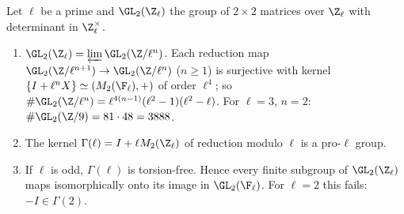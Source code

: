 \begin{proposition}\label{prop:groups:gl2zl}
Let $\ell$ be a prime and $\GL_2(\Z_\ell)$ the group of $2\times2$ matrices over $\Z_\ell$ with determinant in $\Z_\ell^\times$.
\begin{enumerate}[label=(\roman*)]
\item $\GL_2(\Z_\ell)=\varprojlim\GL_2(\Z/\ell^n)$. Each reduction map $\GL_2(\Z/\ell^{n+1})\to\GL_2(\Z/\ell^n)$ ($n\ge1$) is surjective with kernel $\{I+\ell^nX\}\simeq(M_2(\F_\ell),+)$
of order $\ell^4$; so $\#\GL_2(\Z/\ell^n)=\ell^{4(n-1)}(\ell^2-1)(\ell^2-\ell)$. For $\ell=3$, $n=2$: $\#\GL_2(\Z/9)=81\cdot48=3888$.
\item The kernel $\Gamma(\ell)=I+\ell M_2(\Z_\ell)$ of reduction modulo $\ell$ is a pro-$\ell$ group.
\item If $\ell$ is odd, $\Gamma(\ell)$ is torsion-free. Hence every finite subgroup of $\GL_2(\Z_\ell)$ maps isomorphically onto its image in $\GL_2(\F_\ell)$. For $\ell=2$ this
fails: $-I\in\Gamma(2)$.
\end{enumerate}
\end{proposition}

